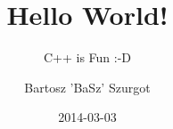 \title{Hello World!}
\subtitle{C++ is Fun :-D}

\author{Bartosz 'BaSz' Szurgot}

\date{2014-03-03}

